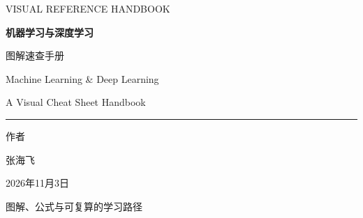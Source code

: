 \hypersetup{pageanchor=false}
\begin{titlepage}
\centering
\vspace*{20mm}
{\sffamily\color{Teal}\large VISUAL REFERENCE HANDBOOK\par}
\vspace{14mm}
{\sffamily\bfseries\color{Ink}\Huge 机器学习与深度学习\par}
\vspace{7mm}
{\sffamily\color{Ink}\LARGE 图解速查手册\par}
\vspace{12mm}
{\large Machine Learning \& Deep Learning\par}
{\large A Visual Cheat Sheet Handbook\par}
\vspace{17mm}
\textcolor{Teal}{\rule{0.68\textwidth}{1.2pt}}\par
\vspace{14mm}
{\large 作者\par}
\vspace{3mm}
张海飞\par
\vfill
{\sffamily\color{Quiet}2026年11月3日\par}
\vspace{5mm}
{\small 图解、公式与可复算的学习路径\par}
\end{titlepage}
\hypersetup{pageanchor=true}
